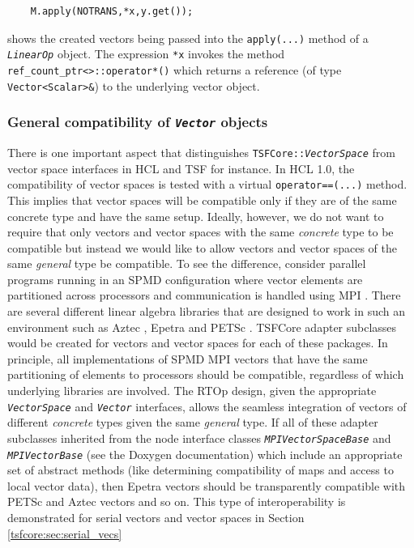 {\scriptsize\begin{verbatim}
    M.apply(NOTRANS,*x,y.get());
\end{verbatim}}

\noindent shows the created vectors being passed into the \texttt{apply(\-...)}
method of a \texttt{\textit{LinearOp}} object.  The expression
\texttt{*x} invokes the method
\texttt{ref\_count\_ptr<>\-::operator*()} which returns a reference
(of type \texttt{Vector<Scalar>\&}) to the underlying vector object.

%
\subsubsection{General compatibility of \texttt{\textit{Vector}} objects}
\label{tsfcore:sec:vec_spc_compatibility}
%

There is one important aspect that distinguishes
\texttt{TSFCore\-::\textit{VectorSpace}} from vector space interfaces in
HCL and TSF for instance.  In HCL 1.0, the compatibility of vector
spaces is tested with a virtual \texttt{operator==(...)}  method.
This implies that vector spaces will be compatible only if they are of
the same concrete type and have the same setup.  Ideally, however, we
do not want to require that only vectors and vector spaces with the
same {\em concrete} type to be compatible but instead we would like to
allow vectors and vector spaces of the same {\em general} type be
compatible.  To see the difference, consider parallel programs running
in an SPMD configuration where vector elements are partitioned across
processors and communication is handled using MPI
\cite{ref:mpi}.  There are several different linear algebra libraries
that are designed to work in such an environment such as Aztec
\cite{sd:aztec}, Epetra \cite{ref:Epetra} and PETSc \cite{ref:petsc}.  TSFCore
adapter subclasses would be created for vectors and vector spaces for
each of these packages.  In principle, all implementations of SPMD MPI
vectors that have the same partitioning of elements to processors
should be compatible, regardless of which underlying libraries
are involved.  The RTOp design, given the appropriate
\texttt{\textit{VectorSpace}} and \texttt{\textit{Vector}} interfaces,
allows the seamless integration of vectors of different {\em concrete}
types given the same {\em general} type.  If all of these adapter
subclasses inherited from the node interface classes
\texttt{\textit{MPIVectorSpaceBase}} and
\texttt{\textit{MPIVectorBase}} (see the Doxygen documentation) which
include an appropriate set of abstract methods (like determining
compatibility of maps and access to local vector data), then Epetra
vectors should be transparently compatible with PETSc and Aztec
vectors and so on.  This type of interoperability is demonstrated for
serial vectors and vector spaces in Section
\ref{tsfcore:sec:serial_vecs}

